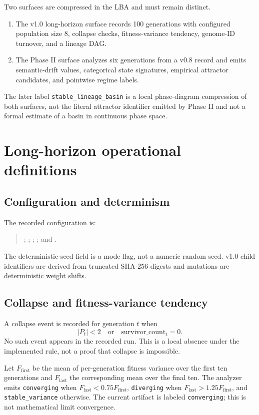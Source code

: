 \documentclass[10pt]{article}
\begin{document}
Two surfaces are compressed in the LBA and must remain distinct.

\begin{enumerate}
\item The v1.0 long-horizon surface records 100 generations with configured
population size 8, collapse checks, fitness-variance tendency, genome-ID
turnover, and a lineage DAG.
\item The Phase II surface analyzes six generations from a v0.8 record and
emits semantic-drift values, categorical state signatures, empirical attractor
candidates, and pointwise regime labels.
\end{enumerate}

The later label \texttt{stable\_lineage\_basin} is a local phase-diagram
compression of both surfaces, not the literal attractor identifier emitted by
Phase II and not a formal estimate of a basin in continuous phase space.

\section{Long-horizon operational definitions}

\subsection{Configuration and determinism}

The recorded configuration is:
\begin{quote}\small
{}; ;
; ; and
.
\end{quote}
The deterministic-seed field is a mode flag, not a numeric random seed. v1.0
child identifiers are derived from truncated SHA-256 digests and mutations are
deterministic weight shifts.

\subsection{Collapse and fitness-variance tendency}

A collapse event is recorded for generation $t$ when
\[
 |P_t| < 2
 \quad\text{or}\quad
 \mathrm{survivor\_count}_t = 0.
\]
No such event appears in the recorded run. This is a local absence under the
implemented rule, not a proof that collapse is impossible.

Let $F_{\mathrm{first}}$ be the mean of per-generation fitness variance over
the first ten generations and $F_{\mathrm{last}}$ the corresponding mean over
the final ten. The analyzer emits \texttt{converging} when
$F_{\mathrm{last}} < 0.75F_{\mathrm{first}}$, \texttt{diverging} when
$F_{\mathrm{last}} > 1.25F_{\mathrm{first}}$, and
\texttt{stable\_variance} otherwise. The current artifact is labeled
\texttt{converging}; this is not mathematical limit convergence.
\end{document}

